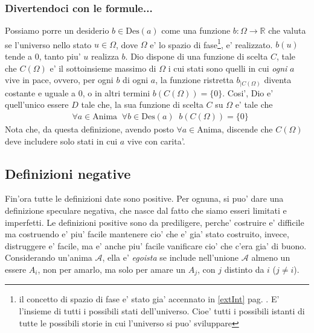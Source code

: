 \subsubsection{Divertendoci con le formule...}
\label{SecondaDefDivertendociConLeFormule}

Possiamo porre un desiderio $b\in \textrm{Des}(a)$ come una funzione $b:\Omega\longrightarrow \mathbb{R}$ che valuta se l'universo nello stato $u\in \Omega$, dove $\Omega$ e' lo spazio di fase\footnote{il concetto di spazio di fase e' stato gia' accennato in \ref{extInt} pag. \pageref{extInt}. E' l'insieme di tutti i possibili stati dell'universo. Cioe' tutti i possibili istanti di tutte le possibili storie in cui l'universo si puo' sviluppare}, e' realizzato. $b(u)$ tende a $0$, tanto piu' $u$ realizza $b$.
Dio dispone di una funzione di scelta $C$, tale che $C(\Omega)$ e' il sottoinsieme massimo di $\Omega$ i cui stati sono quelli in cui \emph{ogni} $a$ vive in pace, ovvero, per ogni $b$ di ogni $a$, la funzione ristretta $b_{|C(\Omega)}$ diventa costante e uguale a $0$, o in altri termini $b(C(\Omega))=\{0\}$. Cosi', Dio e' quell'unico essere $D$ tale che, la sua funzione di scelta $C$ su $\Omega$ e' tale che
    \begin{align*}
        &\forall a \in \textrm{Anima}\;\;\forall b \in \textrm{Des}(a)\;\;b(C(\Omega))= \{0\}
    \end{align*}
Nota che, da questa definizione, avendo posto ${\forall a\in\textrm{Anima}}$, discende che $C(\Omega)$ deve includere solo stati in cui $a$ vive con carita'.

\subsection{Definizioni negative}

Fin'ora tutte le definizioni date sono positive. Per ognuna, si puo' dare una definizione speculare negativa, che nasce dal fatto che siamo esseri limitati e imperfetti. Le definizioni positive sono da prediligere, perche' costruire e' difficile ma costruendo e' piu' facile mantenere cio' che e' gia' stato costruito, invece, distruggere e' facile, ma e' anche piu' facile vanificare cio' che c'era gia' di buono.\\

Considerando un'anima $\mathcal{A}$, ella e' \emph{egoista} se include nell'unione $\mathcal{A}$ almeno un essere $A_i$, non per amarlo, ma solo per amare un $A_j$, con $j$ distinto da $i$ ($j\ne i$).


